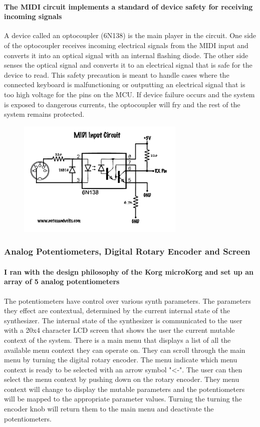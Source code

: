 \documentclass[acmlarge,screen]{acmart}
\begin{document}
	\paragraph{The MIDI circuit implements a standard of device safety for receiving incoming signals} A device called an optocoupler (6N138) is the main player in the circuit. One side of the optocoupler receives incoming electrical signals from the MIDI input and converts it into an optical signal with an internal flashing diode. The other side senses the optical signal and converts it to an electrical signal that is safe for the device to read. This safety precaution is meant to handle cases where the connected keyboard is malfunctioning or outputting an electrical signal that is too high voltage for the pins on the MCU. If device failure occurs and the system is exposed to dangerous currents, the optocoupler will fry and the rest of the system remains protected.
	\begin{figure}[H]
		\includegraphics[width=8cm]{midi_optocoupler_circuit}
		\centering
	\end{figure}

	\subsubsection{Analog Potentiometers, Digital Rotary Encoder and Screen}
	\paragraph{I ran with the design philosophy of the Korg microKorg and set up an array of 5 analog potentiometers} The potentiometers have control over various synth parameters. The parameters they effect are contextual, determined by the current internal state of the synthesizer. The internal state of the synthesizer is communicated to the user with a 20x4 character LCD screen that shows the user the current mutable context of the system. There is a main menu that displays a list of all the available menu context they can operate on. They can scroll through the main menu by turning the digital rotary encoder. The menu indicate which menu context is ready to be selected with an arrow symbol "<-". The user can then select the menu context by pushing down on the rotary encoder. They menu context will change to display the mutable parameters and the potentiometers will be mapped to the appropriate parameter values. Turning the turning the encoder knob will return them to the main menu and deactivate the potentiometers.
\end{document}
